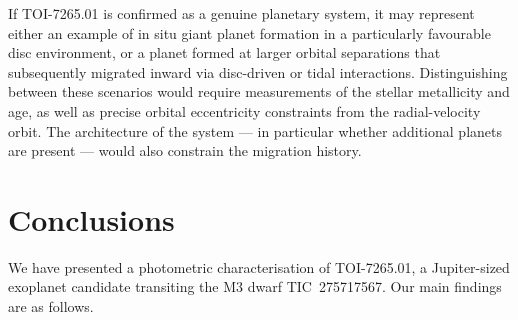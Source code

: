 \documentclass[fleqn,usenatbib]{mnras}
\begin{document}
If TOI-7265.01 is confirmed as a genuine planetary system, it may represent either an example of in situ giant planet formation in a particularly favourable disc environment, or a planet formed at larger orbital separations that subsequently migrated inward via disc-driven or tidal interactions. Distinguishing between these scenarios would require measurements of the stellar metallicity and age, as well as precise orbital eccentricity constraints from the radial-velocity orbit. The architecture of the system — in particular whether additional planets are present — would also constrain the migration history.

\section{Conclusions}
\label{sec:conclusions}

We have presented a photometric characterisation of TOI-7265.01, a Jupiter-sized exoplanet candidate transiting the M3 dwarf TIC~275717567. Our main findings are as follows.
\end{document}
